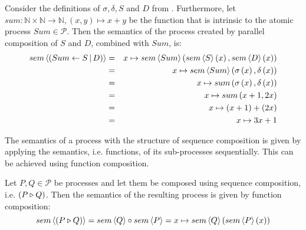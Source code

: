 \begin{example}
\label{exp:sem_parallel}
Consider the definitions of $\sigma, \delta, S$ and $D$ from . Furthermore, let $sum \colon \mathbb{N} \times \mathbb{N} \to \mathbb{N}, \left( x, y \right) \mapsto x + y$ be the function that is intrinsic to the atomic process $Sum \in \mathcal{P}$. Then the semantics of the process created by parallel composition of $S$ and $D$, combined with $Sum$, is: 
  \begin{eqnarray*}
    sem \left\langle \left( Sum \gets S \, | \, D \right) \right\rangle & = & x \mapsto sem \left\langle Sum \right\rangle{\left( sem \left\langle S \right\rangle \left( x \right), sem \left\langle D \right\rangle \left( x \right) \right)} \\
                               & = & x \mapsto sem \left\langle Sum \right\rangle{\left( \sigma\left(x\right), \delta\left(x\right) \right)} \\
                               & = & x \mapsto sum \left( \sigma\left(x\right), \delta\left(x\right) \right) \\
                               & = & x \mapsto sum \left( x+1, 2x \right) \\
                               & = & x \mapsto \left( x+1 \right) + \left( 2x \right) \\
                               & = & x \mapsto 3x + 1
  \end{eqnarray*}
\end{example}


The semantics of a process with the structure of sequence composition is given by applying the semantics, i.e. functions, of its sub-processes sequentially. This can be achieved using function composition.
\begin{definition}
\label{def:sem_sequence}
Let $P, Q \in \mathcal{P}$ be processes and let them be composed using sequence composition, i.e. $\left( P \triangleright Q \right)$. Then the semantics of the resulting process is given by function composition:
  \begin{equation*}
    \label{eqn:sem_sequence}
    sem \left\langle \left( P \triangleright Q \right) \right\rangle = sem \left\langle Q \right\rangle \circ sem \left\langle P \right\rangle = x \mapsto sem \left\langle Q \right\rangle \left( sem \left\langle P \right\rangle \left( x \right) \right)
  \end{equation*}
  \hfill\qedsymbol
\end{definition}


